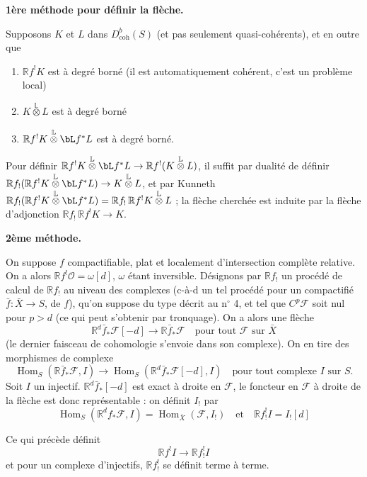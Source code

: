 \documentclass[12pt]{amsart}
\theoremstyle{plain}
\theoremstyle{definition}
\DeclareMathOperator{\Hom}{Hom}
\newcommand{\coh}{\text{coh}}
\newcommand{\cF}{\mathcal{F}}
\newcommand{\cO}{\mathcal{O}}
\newcommand{\cDb}{D^{b}}
\newcommand{\bR}{\mathbb{R}}
\begin{document}
\textbf{1\`ere m\'ethode pour d\'efinir la fl\`eche.}

Supposons $K$ et $L$ dans $\cDb_{\coh}(S)$ (et pas seulement quasi-coh\'erents), et en outre que
\begin{enumerate}
\item[a)] $\bR f^{!}K$ est \`a degr\'e born\'e (il est automatiquement coh\'erent, c'est un probl\`eme local)
\item[b)] $K \overset{\mathbb{L}}{\otimes} L$ est \`a degr\'e born\'e
\item[c)] $\bR f^{!}K \overset{\mathbb{L}}{\otimes} \bL f^{*}L$ est \`a degr\'e born\'e.
\end{enumerate}

Pour d\'efinir $\bR f^{!}K \overset{\mathbb{L}}{\otimes} \bL f^{*}L \to \bR f^{!}(K \overset{\mathbb{L}}{\otimes} L)$, il suffit par dualit\'e de d\'efinir $\bR f_{!}(\bR f^{!}K \overset{\mathbb{L}}{\otimes} \bL f^{*}L) \to K \overset{\mathbb{L}}{\otimes} L$, et par Kunneth $\bR f_{!}(\bR f^{!}K \overset{\mathbb{L}}{\otimes} \bL f^{*}L) = \bR f_{!}\,\bR f^{!}K \overset{\mathbb{L}}{\otimes} L$ ; la fl\`eche cherch\'ee est induite par la fl\`eche d'adjonction $\bR f_{!}\,\bR f^{!}K \to K$.

\textbf{2\`eme m\'ethode.}

On suppose $f$ compactifiable, plat et localement d'intersection compl\`ete relative. On a alors $\bR f^{!}\cO = \omega[d]$, $\omega$ \'etant inversible. D\'esignons par $\bR f_{!}$ un proc\'ed\'e de calcul de $\bR f_{!}$ au niveau des complexes (c-\`a-d un tel proc\'ed\'e pour un compactifi\'e $\bar{f}: \bar{X} \to S$, de $f$), qu'on suppose du type d\'ecrit au n$^{\circ}$ 4, et tel que $C^{p}\cF$ soit nul pour $p > d$ (ce qui peut s'obtenir par tronquage). On a alors une fl\`eche
\[
\bR^{d}\bar{f}_{*}\cF[-d] \to \bR\bar{f}_{*}\cF \quad \text{pour tout } \cF \text{ sur } \bar{X}
\]
(le dernier faisceau de cohomologie s'envoie dans son complexe). On en tire des morphismes de complexe
\[
\Hom_{S}(\bR\bar{f}_{*}\cF, I) \to \Hom_{S}(\bR^{d}\bar{f}_{*}\cF[-d], I) \quad \text{pour tout complexe } I \text{ sur } S.
\]
Soit $I$ un injectif. $\bR^{d}\bar{f}_{*}[-d]$ est exact \`a droite en $\cF$, le foncteur en $\cF$ \`a droite de la fl\`eche est donc repr\'esentable : on d\'efinit $I_{!}$ par
\[
\Hom_{S}(\bR^{d}f_{*}\cF, I) = \Hom_{\bar{X}}(\cF, I_{!}) \quad \text{et} \quad \bR f^{!}_{!}I = I_{!}[d]
\]

Ce qui pr\'ec\`ede d\'efinit
\[
\bR f^{!}I \to \bR f^{!}_{!}I
\]
et pour un complexe d'injectifs, $\bR f^{!}_{!}$ se d\'efinit terme \`a terme.
\end{document}
